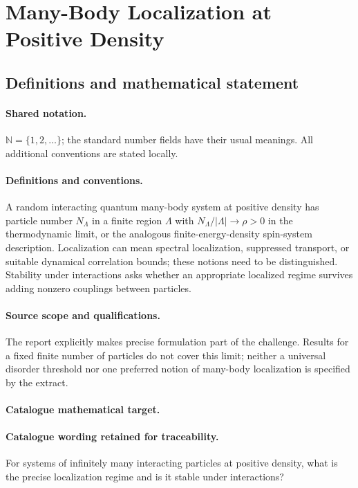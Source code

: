 \documentclass[11pt]{article}
\begin{document}
\section{Many-Body Localization at Positive Density}\label{statement}

\subsection{Definitions and mathematical statement}

\paragraph{Shared notation.}$\mathbb N=\{1,2,\ldots\}$; the standard number fields have their usual meanings. All additional conventions are stated locally.


\paragraph{Definitions and conventions.} A random interacting quantum many-body system at positive density has particle number $N_\Lambda$ in a finite region $\Lambda$ with $N_\Lambda/|\Lambda|\to\rho>0$ in the thermodynamic limit, or the analogous finite-energy-density spin-system description. Localization can mean spectral localization, suppressed transport, or suitable dynamical correlation bounds; these notions need to be distinguished. Stability under interactions asks whether an appropriate localized regime survives adding nonzero couplings between particles.

\paragraph{Source scope and qualifications.} The report explicitly makes precise formulation part of the challenge. Results for a fixed finite number of particles do not cover this limit; neither a universal disorder threshold nor one preferred notion of many-body localization is specified by the extract.

\paragraph{Catalogue mathematical target.}
\paragraph{Catalogue wording retained for traceability.}
For systems of infinitely many interacting particles at positive density, what is the precise localization regime and is it stable under interactions?
\end{document}
